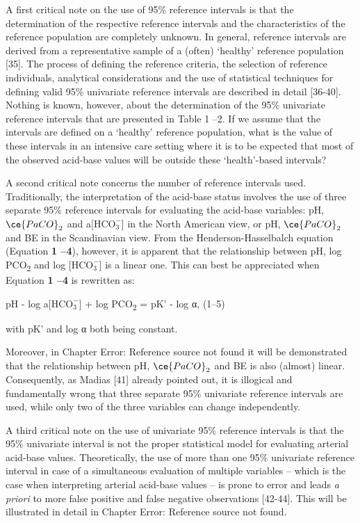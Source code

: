 \documentclass[
  12pt,
  a4paperpaper,
]{report}
\begin{document}
A first critical note on the use of 95\% reference intervals is that the
determination of the respective reference intervals and the
characteristics of the reference population are completely unknown. In
general, reference intervals are derived from a representative sample of
a (often) `healthy' reference population {[}35{]}. The process of
defining the reference criteria, the selection of reference individuals,
analytical considerations and the use of statistical techniques for
defining valid 95\% univariate reference intervals are described in
detail {[}36-40{]}. Nothing is known, however, about the determination
of the 95\% univariate reference intervals that are presented in Table 1
--2. If we assume that the intervals are defined on a `healthy'
reference population, what is the value of these intervals in an
intensive care setting where it is to be expected that most of the
observed acid-base values will be outside these `health'-based
intervals?

A second critical note concerns the number of reference intervals used.
Traditionally, the interpretation of the acid-base status involves the
use of three separate 95\% reference intervals for evaluating the
acid-base variables: pH, \(\ce{PaCO}_{2}\) and
a{[}\(\text{HCO}_{3}^{-}\){]} in the North American view, or pH,
\(\ce{PaCO}_{2}\) and BE in the Scandinavian view. From the
Henderson-Hasselbalch equation (Equation \textbf{1 --4}), however, it is
apparent that the relationship between pH, log PCO\textsubscript{2} and
log {[}\(\text{HCO}_{3}^{-}\){]} is a linear one. This can best be
appreciated when Equation \textbf{1 --4} is rewritten as:

pH - log a{[}\(\text{HCO}_{3}^{-}\){]} + log
P\textsc{CO}\textsubscript{2} = pK' - log α, (1--5)

with pK' and log α both being constant.

Moreover, in Chapter Error: Reference source not found it will be
demonstrated that the relationship between pH, \(\ce{PaCO}_{2}\) and BE
is also (almost) linear. Consequently, as Madias {[}41{]} already
pointed out, it is illogical and fundamentally wrong that three separate
95\% univariate reference intervals are used, while only two of the
three variables can change independently.

A third critical note on the use of univariate 95\% reference intervals
is that the 95\% univariate interval is not the proper statistical model
for evaluating arterial acid-base values. Theoretically, the use of more
than one 95\% univariate reference interval in case of a simultaneous
evaluation of multiple variables -- which is the case when interpreting
arterial acid-base values -- is prone to error and leads \emph{a priori}
to more false positive and false negative observations {[}42-44{]}. This
will be illustrated in detail in Chapter Error: Reference source not
found.
\end{document}
